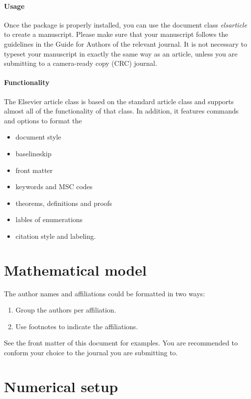 \documentclass[review]{elsarticle}
\begin{document}
\paragraph{Usage} Once the package is properly installed, you can use the document class \emph{elsarticle} to create a manuscript. Please make sure that your manuscript follows the guidelines in the Guide for Authors of the relevant journal. It is not necessary to typeset your manuscript in exactly the same way as an article, unless you are submitting to a camera-ready copy (CRC) journal.

\paragraph{Functionality} The Elsevier article class is based on the standard article class and supports almost all of the functionality of that class. In addition, it features commands and options to format the
\begin{itemize}
\item document style
\item baselineskip
\item front matter
\item keywords and MSC codes
\item theorems, definitions and proofs
\item lables of enumerations
\item citation style and labeling.
\end{itemize}

\section{Mathematical model}

The author names and affiliations could be formatted in two ways:
\begin{enumerate}[(1)]
\item Group the authors per affiliation.
\item Use footnotes to indicate the affiliations.
\end{enumerate}
See the front matter of this document for examples. You are recommended to conform your choice to the journal you are submitting to.

\section{Numerical setup}
\end{document}
